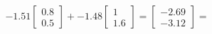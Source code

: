 \documentclass[preview]{standalone}
\begin{document}
\begin{align*}
-1.51 \begin{bmatrix} 0.8 \\ 0.5 \end{bmatrix} + -1.48 \begin{bmatrix} 1 \\ 1.6 \end{bmatrix} = \begin{bmatrix} -2.69 \\ -3.12 \end{bmatrix} =
\end{align*}
\end{document}
